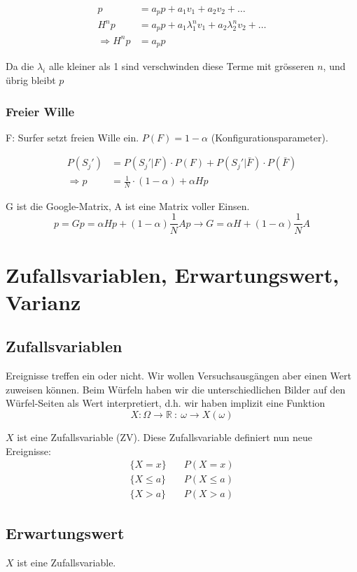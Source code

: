 \documentclass[10pt,a4paper]{scrartcl}
\begin{document}
\begin{align*}
p &= a_pp + a_1v_1 + a_2v_2 + \dots \\
H^np &= a_pp + a_1\lambda_1^nv_1 + a_2\lambda_2^nv_2 + \dots \\
\Rightarrow H^np &=a_pp
\end{align*}

Da die $\lambda_i$ alle kleiner als 1 sind verschwinden diese Terme mit grösseren $n$, und übrig bleibt $p$

\subsubsection{Freier Wille}
F: Surfer setzt freien Wille ein. $P(F) = 1 - \alpha$ (Konfigurationsparameter).

\begin{align*}
P(S_{j}') & = P(S_{j}'|F)\cdot P(F) + P(S_{j}'|\bar{F})\cdot P(\bar{F}) \\
\Rightarrow p & = \frac{1}{N}\cdot (1-\alpha) +  \alpha Hp
\end{align*}

G ist die Google-Matrix, A ist eine Matrix voller Einsen.
$$
p = Gp = \alpha Hp + (1-\alpha)\frac{1}{N}Ap \rightarrow G = \alpha H + (1-\alpha)\frac{1}{N}A 
$$
\fi

\section{Zufallsvariablen, Erwartungswert, Varianz}

\subsection{Zufallsvariablen}

Ereignisse treffen ein oder nicht. Wir wollen Versuchsausgängen aber einen Wert zuweisen können.
Beim Würfeln haben wir die unterschiedlichen Bilder auf den Würfel-Seiten als Wert interpretiert, d.h. wir haben implizit eine Funktion 
$$X: \Omega \rightarrow \mathbb{R}\ :\ \omega \rightarrow X(\omega)$$

$X$ ist eine Zufallsvariable (ZV). Diese Zufallsvariable definiert nun neue Ereignisse:
\begin{align*}
\{ X = x \} \quad& P(X = x) \\
\{ X \le a \} \quad& P(X\le a) \\
\{ X > a \} \quad& P(X > a)
\end{align*}

\subsection{Erwartungswert}
$X$ ist eine Zufallsvariable.
\end{document}
